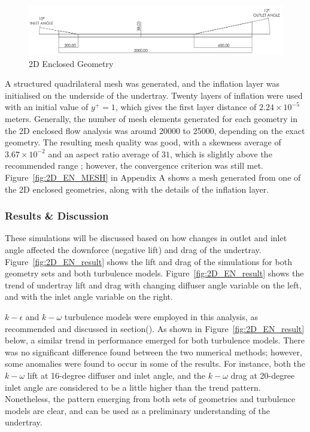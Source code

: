 \begin{figure}[!ht]
    \centering
    \includegraphics[scale=0.18]{Figures/2D_EN/2D_EN_D.PNG}
    \caption{2D Enclosed Geometry}
    \label{fig:2D_EN_Geom}
\end{figure}
  
\noindent A structured quadrilateral mesh was generated, and the inflation layer was initialised on the underside of the undertray. Twenty layers of inflation were used with an initial value of $y^+ = 1$, which gives the first layer distance of $2.24 \times 10^{-5}$ meters. Generally, the number of mesh elements generated for each geometry in the 2D enclosed flow analysis was around 20000 to 25000, depending on the exact geometry. The resulting mesh quality was good, with a skewness average of $3.67 \times 10^{-2}$ and an aspect ratio average of $31$, which is slightly above the recommended range \cite{Lanfrit2005BestFLUENT}; however, the convergence criterion was still met. Figure~\ref{fig:2D_EN_MESH} in Appendix A shows a mesh generated from one of the 2D enclosed geometries, along with the details of the inflation layer.

\subsubsection{Results \& Discussion}
These simulations will be discussed based on how changes in outlet and inlet angle affected the downforce (negative lift) and drag of the undertray. Figure~\ref{fig:2D_EN_result} shows the lift and drag of the simulations for both geometry sets and both turbulence models. Figure~\ref{fig:2D_EN_result} shows the trend of undertray lift and drag with changing diffuser angle variable on the left, and with the inlet angle variable on the right. 

\noindent $k-\epsilon$ and $k-\omega$ turbulence models were employed in this analysis, as recommended\cite{} and discussed in section(). As shown in Figure~\ref{fig:2D_EN_result} below, a similar trend in performance emerged for both turbulence models. There was no significant difference found between the two numerical methods; however, some anomalies were found to occur in some of the results. For instance, both the $k-\omega$ lift at 16-degree diffuser and inlet angle, and the $k-\omega$ drag at 20-degree inlet angle are considered to be a little higher than the trend pattern. Nonetheless, the pattern emerging from both sets of geometries and turbulence models are clear, and can be used as a preliminary understanding of the undertray.

